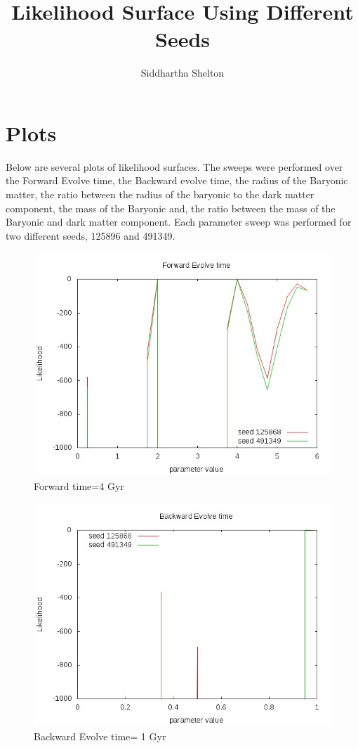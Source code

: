 \documentclass[12pt]{article}
\begin{document}
\title{Likelihood Surface Using Different Seeds}

\author{Siddhartha Shelton}
\maketitle
\setcounter{secnumdepth}{3}
\setcounter{tocdepth}{3}

\section{Plots}
Below are several plots of likelihood surfaces. The sweeps were performed over the Forward Evolve time, the Backward evolve time, the radius of the Baryonic matter, the ratio between the radius of the baryonic to the dark matter component, the mass of the Baryonic and, the ratio between the mass of the Baryonic and dark matter component. Each parameter sweep was performed for two different seeds, 125896 and 491349.

\begin{figure}[h!]
\centering
\includegraphics[width=20cm]{./plots/fortime.jpeg}
\caption{Forward time=4 Gyr}
\end{figure}

\begin{figure}[h!]
\centering
\includegraphics[width=20cm]{./plots/backtime.jpeg}
\caption{Backward Evolve time= 1 Gyr}
\end{figure}
\end{document}

